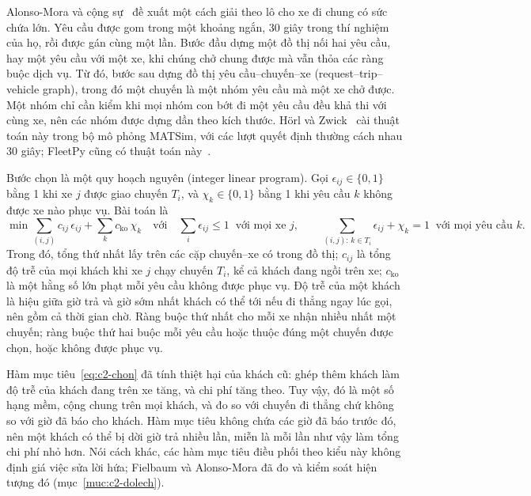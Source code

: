 Alonso-Mora và cộng sự~\cite{alonsomora2017} đề xuất một cách giải theo lô cho xe đi chung có sức chứa lớn. Yêu cầu
được gom trong một khoảng ngắn, 30 giây trong thí nghiệm của họ, rồi được gán cùng một lần. Bước đầu dựng một đồ thị
nối hai yêu cầu, hay một yêu cầu với một xe, khi chúng chở chung được mà vẫn thỏa các ràng buộc dịch vụ. Từ đó, bước
sau dựng đồ thị yêu cầu--chuyến--xe (request--trip--vehicle graph), trong đó một chuyến là một nhóm yêu cầu mà một xe
chở được. Một nhóm chỉ cần kiểm khi mọi nhóm con bớt đi một yêu cầu đều khả thi với cùng xe, nên các nhóm được dựng
dần theo kích thước. Hörl và Zwick~\cite{horl2022} cài thuật toán này trong bộ mô phỏng MATSim, với các lượt quyết
định thường cách nhau 30 giây; FleetPy cũng có thuật toán này~\cite{engelhardt2026}.

Bước chọn là một quy hoạch nguyên (integer linear program). Gọi $\epsilon_{ij} \in \{0, 1\}$ bằng 1 khi xe $j$ được
giao chuyến $T_i$, và $\chi_k \in \{0, 1\}$ bằng 1 khi yêu cầu $k$ không được xe nào phục vụ. Bài toán là
\begin{equation}
\min \sum_{(i,j)} c_{ij}\,\epsilon_{ij} + \sum_{k} c_{\mathrm{ko}}\,\chi_k
\quad\text{với}\quad
\sum_{i} \epsilon_{ij} \le 1 \;\;\text{với mọi xe } j, \qquad
\sum_{(i,j):\, k \in T_i} \epsilon_{ij} + \chi_k = 1 \;\;\text{với mọi yêu cầu } k .
\label{eq:c2-chon}
\end{equation}
Trong đó, tổng thứ nhất lấy trên các cặp chuyến--xe có trong đồ thị; $c_{ij}$ là tổng độ trễ của mọi khách khi xe $j$
chạy chuyến $T_i$, kể cả khách đang ngồi trên xe; $c_{\mathrm{ko}}$ là một hằng số lớn phạt mỗi yêu cầu không được
phục vụ. Độ trễ của một khách là hiệu giữa giờ trả và giờ sớm nhất khách có thể tới nếu đi thẳng ngay lúc gọi, nên
gồm cả thời gian chờ. Ràng buộc thứ nhất cho mỗi xe nhận nhiều nhất một chuyến; ràng buộc thứ hai buộc mỗi yêu cầu
hoặc thuộc đúng một chuyến được chọn, hoặc không được phục vụ.

Hàm mục tiêu~\eqref{eq:c2-chon} đã tính thiệt hại của khách cũ: ghép thêm khách làm độ trễ của khách đang trên xe
tăng, và chi phí tăng theo. Tuy vậy, đó là một số hạng mềm, cộng chung trên mọi khách, và đo so với chuyến đi thẳng
chứ không so với giờ đã báo cho khách. Hàm mục tiêu không chứa các giờ đã báo trước đó, nên một khách có thể bị dời
giờ trả nhiều lần, miễn là mỗi lần như vậy làm tổng chi phí nhỏ hơn. Nói cách khác, các hàm mục tiêu điều phối theo
kiểu này không định giá việc sửa lời hứa; Fielbaum và Alonso-Mora đã đo và kiểm soát hiện tượng đó
(mục~\ref{muc:c2-dolech}).

